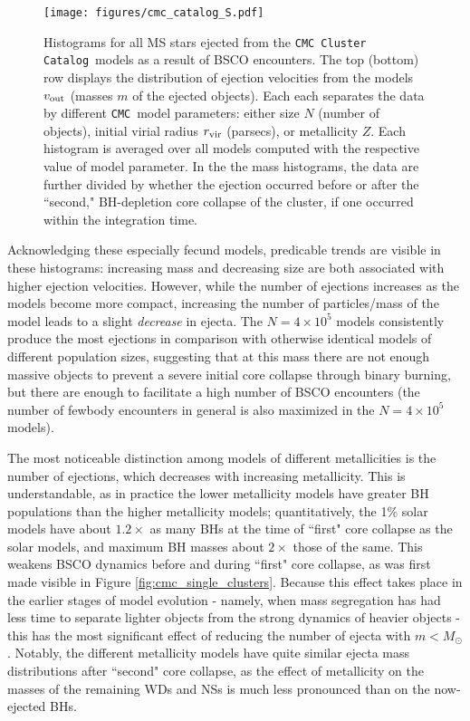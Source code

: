 \documentclass[twocolumn]{aastex631}
\newcommand{\CMC}{\texttt{CMC}}
\newcommand{\CMCcat}{\texttt{CMC Cluster Catalog}}
\begin{document}
\begin{figure*}
    \centering
    \texttt{[image: figures/cmc\_catalog\_S.pdf]}
    \caption{
        Histograms for all MS stars ejected from the \CMCcat\ models as a result of BSCO encounters.
        The top (bottom) row displays the distribution of ejection velocities from the models $v_{\rm out}$ (masses $m$ of the ejected objects).
        Each each separates the data by different \CMC\ model parameters: either size $N$ (number of objects), initial virial radius $r_{\rm vir}$ (parsecs), or metallicity $Z$.
        Each histogram is averaged over all models computed with the respective value of model parameter.
        In the the mass histograms, the data are further divided by whether the ejection occurred before or after the ``second," BH-depletion core collapse of the cluster, if one occurred within the integration time.
    }
    \label{fig:cmc_catalog}
\end{figure*}

Acknowledging these especially fecund models, predicable trends are visible in these histograms: increasing mass and decreasing size are both associated with higher ejection velocities.
However, while the number of ejections increases as the models become more compact, increasing the number of particles/mass of the model leads to a slight \textit{decrease} in ejecta.
The $N = 4 \times 10^5$ models consistently produce the most ejections in comparison with otherwise identical models of different population sizes, suggesting that at this mass there are not enough massive objects to prevent a severe initial core collapse through binary burning, but there are enough to facilitate a high number of BSCO encounters (the number of fewbody encounters in general is also maximized in the $N = 4 \times 10^5$ models).

The most noticeable distinction among models of different metallicities is the number of ejections, which decreases with increasing metallicity.
This is understandable, as in practice the lower metallicity models have greater BH populations than the higher metallicity models; quantitatively, the 1\% solar models have about $1.2 \times$ as many BHs at the time of ``first" core collapse as the solar models, and maximum BH masses about $2 \times$ those of the same.
This weakens BSCO dynamics before and during ``first" core collapse, as was first made visible in Figure \ref{fig:cmc_single_clusters}.
Because this effect takes place in the earlier stages of model evolution - namely, when mass segregation has had less time to separate lighter objects from the strong dynamics of heavier objects - this has the most significant effect of reducing the number of ejecta with $m < M_\odot$.
Notably, the different metallicity models have quite similar ejecta mass distributions after ``second" core collapse, as the effect of metallicity on the masses of the remaining WDs and NSs is much less pronounced than on the now-ejected BHs.
\end{document}
